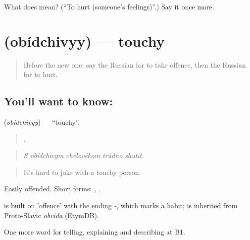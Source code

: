\begin{tcolorbox}[breakable,colback=teal!4,colframe=teal!35!black,title={Before you move on}]
What does  mean? (\textquotedblleft{}To hurt (someone's feelings)\textquotedblright{}.) Say it once more.
\end{tcolorbox}
\section[\texorpdfstring{\ru{обидчивый} (obídchivyy)}{обидчивый (obídchivyy)}]{ (obídchivyy) — touchy}

\label{lesson:RU-C471-obidchivyy}



\begin{quote}
Before the new one: say the Russian for to take offence, then the Russian for to hurt.
\end{quote}

\subsection*{You'll want to know: }
\textbf{} (\emph{obídchivyy}) — \textquotedblleft{}touchy\textquotedblright{}.

\begin{quote}
    .
\end{quote}

\begin{quote}
\emph{S obídchivym chelovékom trúdno shutít.}
\end{quote}

\begin{quote}
It's hard to joke with a touchy person.
\end{quote}

Easily offended. Short forms: , .

\begin{cousinweb}
\emph{} is built on \emph{} 'offence' with the ending \emph{-}, which marks a habit; \emph{} is inherited from Proto-Slavic \emph{obvida} (EtymDB).
\end{cousinweb}

\begin{grammarlens}[title={What you've built}]
One more word for telling, explaining and describing at B1.
\end{grammarlens}

